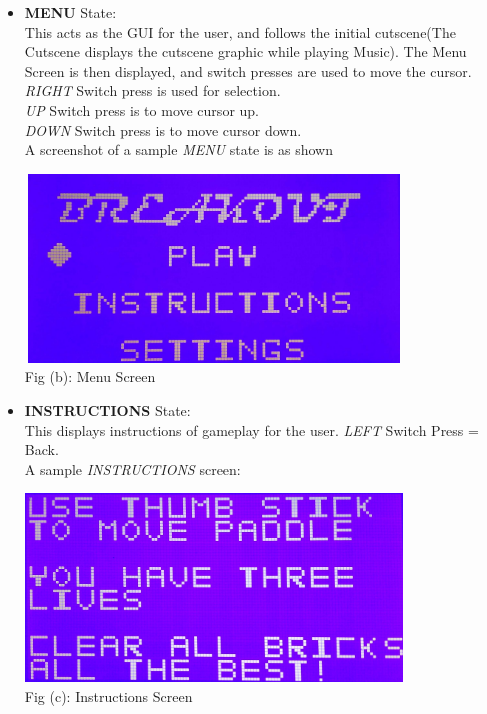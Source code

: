 \documentclass{article}
\begin{document}
\begin{itemize}
  \item \textbf{MENU} State: \\ \qquad This acts as the GUI for the user, and follows the initial cutscene(The Cutscene displays the cutscene graphic while playing Music).  The Menu Screen is then displayed, and switch presses are used to move the cursor. 
  \\ \textit{RIGHT} Switch press is used for selection.
  \\ \textit{UP} Switch press is to move cursor up.
  \\ \textit{DOWN} Switch press is to move cursor down.
  \\ A screenshot of a sample \textit{MENU} state is as shown
  \begin{center}
  \includegraphics[width=10cm, height = 5cm]{Images/menuScreen} \\
  {\small Fig (b): Menu Screen} \\
  \end{center}
  \item \textbf{INSTRUCTIONS} State: \\ \qquad This displays instructions of gameplay for the user.
  \textit{LEFT} Switch Press = Back.
  \\ A sample \textit{INSTRUCTIONS} screen:
    \begin{center}
  \includegraphics[width=10cm, height = 5cm]{Images/instructionsScreen} \\
  {\small Fig (c): Instructions Screen} \\

\end{center}
\end{itemize}
\end{document}
